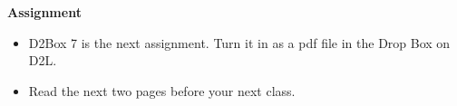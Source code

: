 \noindent
{\bf Assignment} \vspace{-.2in}
\begin{itemize}
\item D2Box 7 is the next assignment.
    Turn it in as a pdf file in the Drop Box on D2L.
\item Read the next two pages before your next class.
\end{itemize}
